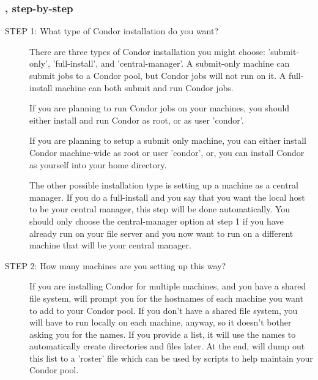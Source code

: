 \subsubsection{, step-by-step}

\begin{description}
\item[STEP 1: What type of Condor installation do you want?]

     There are three types of Condor installation you might choose:
     'submit-only', 'full-install', and 'central-manager'.  A
     submit-only machine can submit jobs to a Condor pool, but Condor
     jobs will not run on it.  A full-install machine can both submit
     and run Condor jobs.  

     If you are planning to run Condor jobs on your machines, you
     should either install and run Condor as root, or as user
     'condor'.  

     If you are planning to setup a submit only machine, you can
     either install Condor machine-wide as root or user 'condor', or,
     you can install Condor as yourself into your home directory.

     The other possible installation type is setting up a machine as a
     central manager.  If you do a full-install and you say that you
     want the local host to be your central manager, this step will be
     done automatically.  You should only choose the central-manager
     option at step 1 if you have already run  on your
     file server and you now want to run  on a different
     machine that will be your central manager.

\item[STEP 2: How many machines are you setting up this way?]

     If you are installing Condor for multiple machines, and you have
     a shared file system,  will prompt you for the
     hostnames of each machine you want to add to your Condor pool.
     If you don't have a shared file system, you will have to run
      locally on each machine, anyway, so it doesn't
     bother asking you for the names.  If you provide a list, it will
     use the names to automatically create directories and files
     later.  At the end,  will dump out this list to a
     'roster' file which can be used by scripts to help maintain your
     Condor pool.


\end{description}
